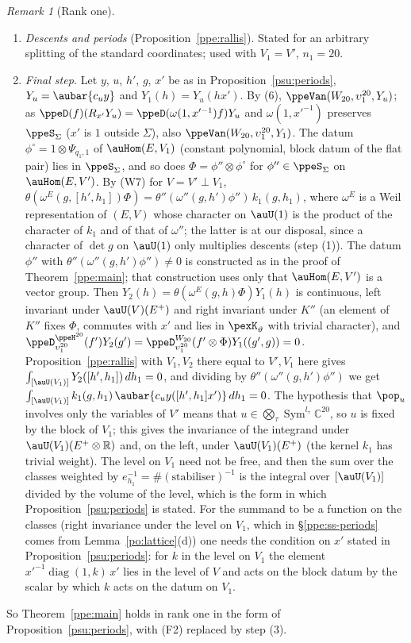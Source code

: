 \documentclass[10pt]{amsart}
\theoremstyle{definition}
\theoremstyle{remark}
\newtheorem{remark}[theorem]{Remark}
\newcommand{\C}{\mathbb C}
\newcommand{\R}{\mathbb R}
\begin{document}
\begin{remark}[Rank one]
\begin{enumerate}
\item[(7)] \emph{Descents and periods} (Proposition~\ref{ppe:rallis}). Stated for an arbitrary splitting
of the standard coordinates; used with $V_1=V'$, $n_1=20$.
\item[(8)] \emph{Final step.} Let $y$, $u$, $h'$, $g$, $x'$ be as in Proposition~\ref{psu:periods},
$Y_u=\aubar{c_uy}$ and $Y_1(h)=Y_u(hx')$. By (6), $\ppeVan(W_{20},\upsilon_1^{20},Y_u)$; as
$\ppeD(f)(R_{x'}Y_u)=\ppeD(\omega(1,x'^{-1})f)Y_u$ and $\omega(1,x'^{-1})$ preserves $\ppeS_\Sigma$
($x'$ is $1$ outside $\Sigma$), also $\ppeVan(W_{20},\upsilon_1^{20},Y_1)$. The datum
$\phi^\circ=1\otimes\Psi_{q_1,1}$ of $\auHom(E,V_1)$ (constant polynomial, block datum of the flat pair)
lies in $\ppeS_\Sigma$, and so does $\Phi=\phi''\otimes\phi^\circ$ for $\phi''\in\ppeS_\Sigma$ on
$\auHom(E,V')$. By (W7) for $V=V'\perp V_1$, $\theta(\omega^E(g,[h',h_1])\Phi)=\theta''(\omega''(g,h')
\phi'')\,k_1(g,h_1)$, where $\omega^E$ is a Weil representation of $(E,V)$ whose character on $\auU(1)$
is the product of the character of $k_1$ and of that of $\omega''$; the latter is at our disposal,
since a character of $\det g$ on $\auU(1)$ only multiplies descents (step (1)). The datum $\phi''$ with
$\theta''(\omega''(g,h')\phi'')\ne0$ is constructed as in the proof of Theorem~\ref{ppe:main}; that
construction uses only that $\auHom(E,V')$ is a vector group. Then $Y_2(h)=\theta(\omega^E(g,h)\Phi)
Y_1(h)$ is continuous, left invariant under $\auU(V)(E^+)$ and right invariant under $K''$ (an element
of $K''$ fixes $\Phi$, commutes with $x'$ and lies in $\pexK_\vartheta$ with trivial character), and
$\ppeD^{\ppeH^{20}}_{\upsilon_1^{20}}(f')Y_2(g')=\ppeD^{W_{20}}_{\upsilon_1^{20}}(f'\otimes\Phi)Y_1((g',g))=0$.
Proposition~\ref{ppe:rallis} with $V_1,V_2$ there equal to $V',V_1$ here gives $\int_{[\auU(V_1)]}Y_2([h',
h_1])\,dh_1=0$, and dividing by $\theta''(\omega''(g,h')\phi'')$ we get $\int_{[\auU(V_1)]}k_1(g,h_1)\,
\aubar{c_uy([h',h_1]x')}\,dh_1=0$. The hypothesis that $\pop_u$ involves only the variables of $V'$
means that $u\in\bigotimes_\tau\operatorname{Sym}^{l_\tau}\C^{20}$, so $u$ is fixed by the block of $V_1$;
this gives the invariance of the integrand under $\auU(V_1)(E^+\otimes\R)$ and, on the left, under
$\auU(V_1)(E^+)$ (the kernel $k_1$ has trivial weight). The level on $V_1$ need not be
free, and then the sum over the classes weighted by $e_{h_1}^{-1}=\#(\text{stabiliser})^{-1}$ is the
integral over $[\auU(V_1)]$ divided by the volume of the level, which is the form in which
Proposition~\ref{psu:periods} is stated. For the summand to be a function on the classes (right
invariance under the level on $V_1$, which in \S\ref{ppe:ss-periods} comes from
Lemma~\ref{po:lattice}(d)) one needs the condition on $x'$ stated in Proposition~\ref{psu:periods}:
for $k$ in the level on $V_1$ the element $x'^{-1}\operatorname{diag}(1,k)\,x'$ lies in the level of
$V$ and acts on the block datum by the scalar by which $k$ acts on the datum on $V_1$.
\end{enumerate}
So Theorem~\ref{ppe:main} holds in rank one in the form of Proposition~\ref{psu:periods}, with (F2)
replaced by step (3).
\end{remark}
\end{document}

